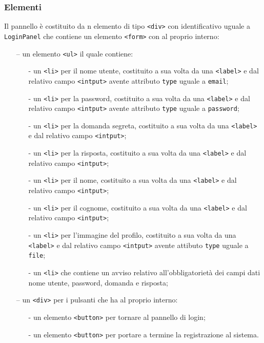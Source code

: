 \subsubsection*{Elementi}
Il pannello è costituito da n elemento di tipo \verb'<div>' con identificativo uguale a \verb'LoginPanel' che contiene un elemento \verb'<form>' con al proprio interno:
\begin{itemize}
  \item[--] un elemento \verb'<ul>' il quale contiene:
  \begin{itemize}
    \item[-] un \verb'<li>' per il nome utente, costituito a sua volta da una \verb'<label>' e dal relativo campo \verb'<intput>' avente attributo \verb'type' uguale a \verb'email';
    \item[-] un \verb'<li>' per la password, costituito a sua volta da una \verb'<label>' e dal relativo campo \verb'<intput>' avente attributo \verb'type' uguale a \verb'password';
    \item[-] un \verb'<li>' per la domanda segreta, costituito a sua volta da una \verb'<label>' e dal relativo campo \verb'<intput>';
    \item[-] un \verb'<li>' per la risposta, costituito a sua volta da una \verb'<label>' e dal relativo campo \verb'<intput>';
    \item[-] un \verb'<li>' per il nome, costituito a sua volta da una \verb'<label>' e dal relativo campo \verb'<intput>';
    \item[-] un \verb'<li>' per il cognome, costituito a sua volta da una \verb'<label>' e dal relativo campo \verb'<intput>';
    \item[-] un \verb'<li>' per l'immagine del profilo, costituito a sua volta da una \verb'<label>' e dal relativo campo \verb'<intput>' avente attibuto \verb'type' uguale a \verb'file';
    \item[-] un \verb'<li>' che contiene un avviso relativo all'obbligatorietà dei campi dati nome utente, password, domanda e risposta;
  \end{itemize}
  \item[--] un \verb'<div>' per i pulsanti che ha al proprio interno:
  \begin{itemize}
    \item[-] un elemento \verb'<button>' per tornare al pannello di login;
    \item[-] un elemento \verb'<button>' per portare a termine la registrazione al sistema.
  \end{itemize}
\end{itemize}


